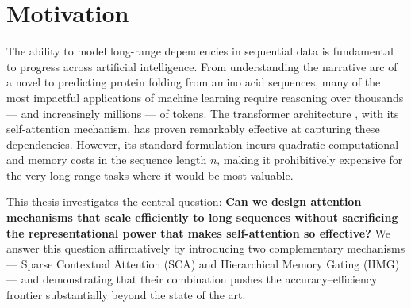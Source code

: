 \section{Motivation}

The ability to model long-range dependencies in sequential data is fundamental to progress
across artificial intelligence. From understanding the narrative arc of a novel to predicting
protein folding from amino acid sequences, many of the most impactful applications of machine
learning require reasoning over thousands — and increasingly millions — of tokens. The
transformer architecture \cite{vaswani2017attention}, with its self-attention mechanism, has
proven remarkably effective at capturing these dependencies. However, its standard formulation
incurs quadratic computational and memory costs in the sequence length $n$, making it
prohibitively expensive for the very long-range tasks where it would be most valuable.

This thesis investigates the central question: \textbf{Can we design attention mechanisms that
scale efficiently to long sequences without sacrificing the representational power that makes
self-attention so effective?} We answer this question affirmatively by introducing two
complementary mechanisms — Sparse Contextual Attention (SCA) and Hierarchical Memory Gating
(HMG) — and demonstrating that their combination pushes the accuracy--efficiency frontier
substantially beyond the state of the art.
